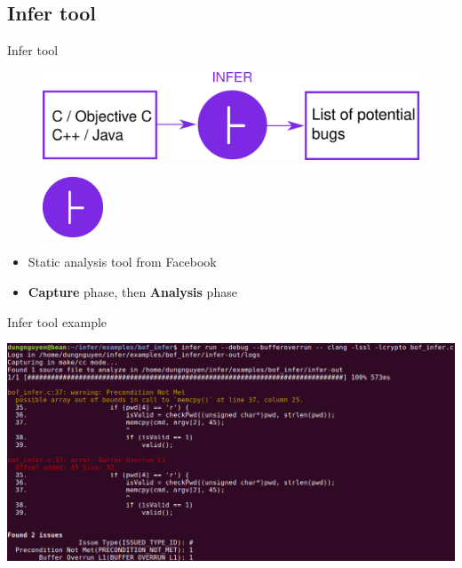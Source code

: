 \documentclass{beamer}
\begin{document}
\subsection{Infer tool}

\begin{frame}{Infer tool}

\begin{figure}
\includegraphics[width=\textwidth]{Figures/InferDrawing.png}
\end{figure}

\end{frame}

\begin{frame}

\begin{figure}
\includegraphics[width = 1.8cm]{Figures/InferLogo.png}

\end{figure}

\vspace{1cm}

\begin{itemize}
\item Static analysis tool from Facebook
\item \textbf{Capture} phase, then \textbf{Analysis} phase
\end{itemize}

\end{frame}

\begin{frame}{Infer tool example}

\includegraphics[width=\textwidth]{Figures/main.c/inferRunOnMain.png}
\end{frame}
\end{document}

